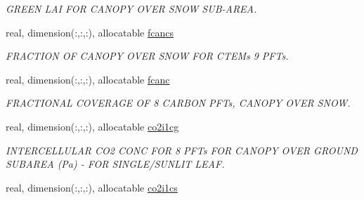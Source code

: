 \begin{DoxyCompactItemize}
\begin{DoxyCompactList}\small\item\em G\+R\+E\+E\+N L\+A\+I F\+O\+R C\+A\+N\+O\+P\+Y O\+V\+E\+R S\+N\+O\+W S\+U\+B-\/\+A\+R\+E\+A. \end{DoxyCompactList}\item 
\hypertarget{structctem__statevars_1_1veg__rot_a9741b26d8192f611d791fbdcc1ec22ad}{}real, dimension(\+:,\+:,\+:), allocatable \hyperlink{structctem__statevars_1_1veg__rot_a9741b26d8192f611d791fbdcc1ec22ad}{fcancs}\label{structctem__statevars_1_1veg__rot_a9741b26d8192f611d791fbdcc1ec22ad}

\begin{DoxyCompactList}\small\item\em F\+R\+A\+C\+T\+I\+O\+N O\+F C\+A\+N\+O\+P\+Y O\+V\+E\+R S\+N\+O\+W F\+O\+R C\+T\+E\+M\textquotesingle{}s 9 P\+F\+Ts. \end{DoxyCompactList}\item 
\hypertarget{structctem__statevars_1_1veg__rot_a8b767dfd29296d9c9f6094457e34d65c}{}real, dimension(\+:,\+:,\+:), allocatable \hyperlink{structctem__statevars_1_1veg__rot_a8b767dfd29296d9c9f6094457e34d65c}{fcanc}\label{structctem__statevars_1_1veg__rot_a8b767dfd29296d9c9f6094457e34d65c}

\begin{DoxyCompactList}\small\item\em F\+R\+A\+C\+T\+I\+O\+N\+A\+L C\+O\+V\+E\+R\+A\+G\+E O\+F 8 C\+A\+R\+B\+O\+N P\+F\+Ts, C\+A\+N\+O\+P\+Y O\+V\+E\+R S\+N\+O\+W. \end{DoxyCompactList}\item 
\hypertarget{structctem__statevars_1_1veg__rot_a115e21230a008413aab1d7bd7ba8cbe3}{}real, dimension(\+:,\+:,\+:), allocatable \hyperlink{structctem__statevars_1_1veg__rot_a115e21230a008413aab1d7bd7ba8cbe3}{co2i1cg}\label{structctem__statevars_1_1veg__rot_a115e21230a008413aab1d7bd7ba8cbe3}

\begin{DoxyCompactList}\small\item\em I\+N\+T\+E\+R\+C\+E\+L\+L\+U\+L\+A\+R C\+O2 C\+O\+N\+C F\+O\+R 8 P\+F\+Ts F\+O\+R C\+A\+N\+O\+P\+Y O\+V\+E\+R G\+R\+O\+U\+N\+D S\+U\+B\+A\+R\+E\+A (Pa) -\/ F\+O\+R S\+I\+N\+G\+L\+E/\+S\+U\+N\+L\+I\+T L\+E\+A\+F. \end{DoxyCompactList}\item 
\hypertarget{structctem__statevars_1_1veg__rot_a29871930c8a2a413baf520863204be1a}{}real, dimension(\+:,\+:,\+:), allocatable \hyperlink{structctem__statevars_1_1veg__rot_a29871930c8a2a413baf520863204be1a}{co2i1cs}\label{structctem__statevars_1_1veg__rot_a29871930c8a2a413baf520863204be1a}


\end{DoxyCompactItemize}
